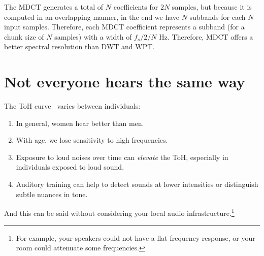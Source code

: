 The MDCT generates a total of $N$ coefficients for $2N$ samples, but
because it is computed in an overlapping manner, in the end we have
$N$ subbands for each $N$ input samples. Therefore, each MDCT
coefficient represents a subband (for a chunk size of $N$ samples)
with a width of $f_s/2/N$ Hz. Therefore, MDCT offers a better spectral
resolution than DWT and WPT.

\section{Not everyone hears the same way}

The ToH curve~\cite{bosi2003intro} varies between individuals:
\begin{enumerate}
\item In general, women hear better than men.
\item With age, we lose sensitivity to high frequencies.
\item Exposure to loud noises over time can \emph{elevate} the ToH,
  especially in individuals exposed to loud sound.
\item Auditory training can help to detect sounds at lower intensities
  or distinguish subtle nuances in tone.
\end{enumerate}

And this can be said without considering your local audio
infrastructure.\footnote{For example,
  your speakers could not have a flat frequency response, or your room
  could attenuate some frequencies.}




